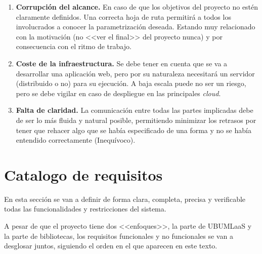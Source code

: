 \begin{enumerate}
\item \textbf{Corrupción del alcance.} En caso de que los objetivos del proyecto no estén claramente definidos. Una correcta hoja de ruta permitirá a todos los involucrados a conocer la parametrización deseada. Estando muy relacionado con la motivación (no <<ver el final>> del proyecto nunca) y por consecuencia con el ritmo de trabajo.
\item \textbf{Coste de la infraestructura.} Se debe tener en cuenta que se va a desarrollar una aplicación web, pero por su naturaleza necesitará un servidor (distribuido o no) para su ejecución. A baja escala puede no ser un riesgo, pero se debe vigilar en caso de despliegue en las principales \textit{cloud}.
\item \textbf{Falta de claridad.} La comunicación entre todas las partes implicadas debe de ser lo más fluida y natural posible, permitiendo minimizar los retrasos por tener que rehacer algo que se había especificado de una forma y no se había entendido correctamente (Inequívoco).
\end{enumerate}

\newpage
\section{Catalogo de requisitos}\label{catalogo-de-riquisitos}
En esta sección se van a definir de forma clara, completa, precisa y verificable todas las funcionalidades y restricciones del sistema.

A pesar de que el proyecto tiene dos <<enfoques>>, la parte de UBUMLaaS y la parte de bibliotecas, los requisitos funcionales y no funcionales se van a desglosar juntos, siguiendo el orden en el que aparecen en este texto.

